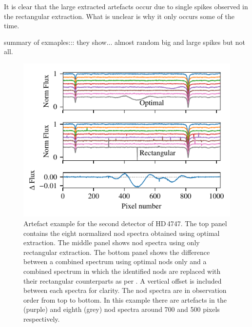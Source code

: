 It is clear that the large extracted artefacts occur due to single spikes observed in the rectangular extraction. What is unclear is why it only occurs some of the time.

summary of exmaples::: they show...  almost random big and large spikes but not all.



 \begin{figure}
     \centering
     \includegraphics[width=0.9\linewidth]{figures/appendix/bp_plots/extraction_comparision_HD4747-1_chip_2}
     \caption{Artefact example for the second detector of {HD\,4747}.  The top panel contains the eight normalized nod spectra obtained using optimal extraction. The middle panel shows nod spectra using only rectangular extraction. The bottom panel shows the difference between a combined spectrum using optimal nods only and a combined spectrum in which the identified nods are replaced with their rectangular counterparts as per . A vertical offset is included between each spectra for clarity. The nod spectra are in observation order from top to bottom. In this example there are artefacts in the  (purple) and eighth (grey) nod spectra around 700 and 500 pixels respectively.}
     \label{fig:artefact_example1}
 \end{figure}
